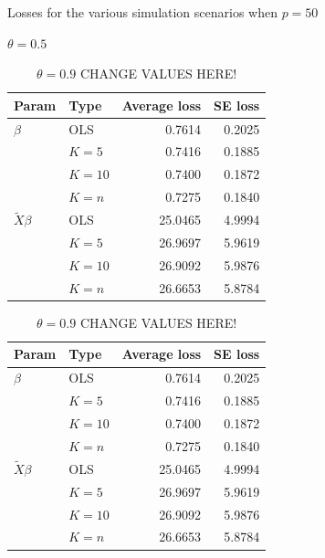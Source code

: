 \documentclass{article}\usepackage[]{graphicx}\usepackage[]{color}
\begin{document}
\begin{table}[!htb]
    \caption{Losses for the various simulation scenarios when $p=50$}
    \begin{minipage}{.5\linewidth}
      \caption{$\theta=0.5$}
      \centering
      \begin{tabular}{|llrr|}
       \hline
     Param & Type & Average loss & SE loss \\ 
      \hline
   $\beta$ & OLS & 0.7614 & 0.2025 \\ 
   & $K=5$  & 0.7416 & 0.1885 \\ 
   & $K=10$ & 0.7400 & 0.1872 \\ 
   & $K=n$ & 0.7275 & 0.1840 \\ 
   \hline
    $\tilde{X}\beta$ & OLS & 25.0465 & 4.9994 \\ 
    & $K=5$ & 26.9697 & 5.9619 \\ 
    & $K=10$ & 26.9092 & 5.9876 \\ 
    & $K=n$ & 26.6653 & 5.8784 \\ 
    \hline
  \end{tabular}
  \end{minipage}%
  \begin{minipage}{.5\linewidth}
      \centering
        \caption{$\theta=0.9$ CHANGE VALUES HERE!}
        \begin{tabular}{|llrr|}
       \hline
     Param & Type & Average loss & SE loss \\ 
      \hline
   $\beta$ & OLS & 0.7614 & 0.2025 \\ 
   & $K=5$  & 0.7416 & 0.1885 \\ 
   & $K=10$ & 0.7400 & 0.1872 \\ 
   & $K=n$ & 0.7275 & 0.1840 \\ 
   \hline
    $\tilde{X}\beta$ & OLS & 25.0465 & 4.9994 \\ 
    & $K=5$ & 26.9697 & 5.9619 \\ 
    & $K=10$ & 26.9092 & 5.9876 \\ 
    & $K=n$ & 26.6653 & 5.8784 \\ 
    \hline
  \end{tabular}
    \end{minipage} 
\end{table}
 
\end{document}
